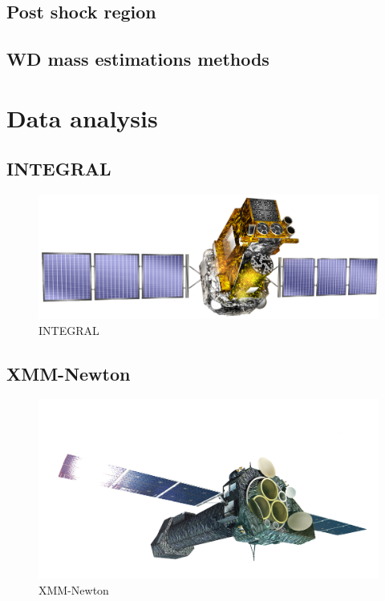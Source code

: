 \documentclass[oneside,a4paper,11pt]{report}
\begin{document}
\section{Post shock region}
\section{WD mass estimations methods}

\chapter{Data analysis}

\section{INTEGRAL}

\begin{figure}[!hbt]
\centering
\includegraphics[totalheight=4cm]{integral}
\caption{INTEGRAL}
\label{microblazar} 
\end{figure}


\section{XMM-Newton}

\begin{figure}[!hbt]
\centering
\includegraphics[totalheight=6cm]{XMM}
\caption{XMM-Newton }
\label{microblazar} 
\end{figure}
\end{document}
